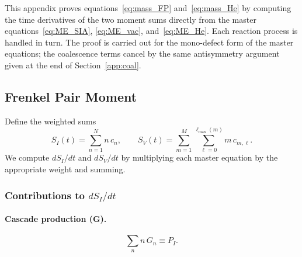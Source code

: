 \documentclass[pdflatex,sn-basic]{sn-jnl} %
\begin{document}
This appendix proves equations~\eqref{eq:mass_FP} and~\eqref{eq:mass_He}
by computing the time derivatives of the two moment sums directly from the
master equations~\eqref{eq:ME_SIA}, \eqref{eq:ME_vac}, and~\eqref{eq:ME_He}.
Each reaction process is handled in turn. The proof is carried out for the
mono-defect form of the master equations; the coalescence terms cancel
by the same antisymmetry argument given at the end of
Section~\ref{app:coal}.

\subsection{Frenkel Pair Moment}
\label{app:FP}

Define the weighted sums
\begin{equation}\label{eq:SI_SV}
    S_I(t) = \sum_{n=1}^{N} n\,c_n,
    \qquad
    S_V(t) = \sum_{m=1}^{M}\sum_{\ell=0}^{\ell_{\max}(m)} m\,c_{m,\ell}.
\end{equation}
We compute $dS_I/dt$ and $dS_V/dt$ by multiplying each master equation by
the appropriate weight and summing.

\subsubsection*{Contributions to $dS_I/dt$}

\paragraph{Cascade production (G).}
\begin{equation}
    \sum_n n\,G_n \equiv P_I.
\end{equation}
\end{document}
